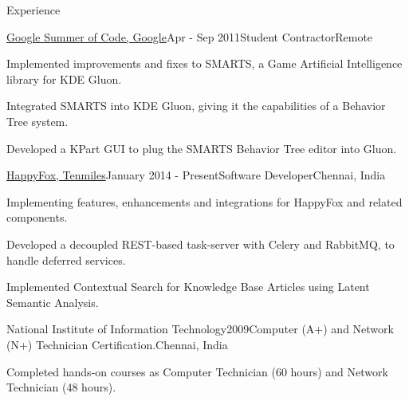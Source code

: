 \documentclass{resume} %
\begin{document}
\begin{rSection}{Experience}

    \begin{rSubsection}{\href{https://www.google-melange.com/gsoc/project/details/google/gsoc2011/pranavrc/5757334940811264}{Google Summer of Code, Google}}{Apr - Sep 2011}{Student Contractor}{Remote}
\item Implemented improvements and fixes to SMARTS, a Game Artificial Intelligence library for KDE Gluon.
\item Integrated SMARTS into KDE Gluon, giving it the capabilities of a Behavior Tree system.
\item Developed a KPart GUI to plug the SMARTS Behavior Tree editor into Gluon.
\end{rSubsection}


\begin{rSubsection}{\href{https://happyfox.com/}{HappyFox, Tenmiles}}{January 2014 - Present}{Software Developer}{Chennai, India}
\item Implementing features, enhancements and integrations for HappyFox and related components.
\item Developed a decoupled REST-based task-server with Celery and RabbitMQ, to handle deferred services.
\item Implemented Contextual Search for Knowledge Base Articles using Latent Semantic Analysis.
\end{rSubsection}


\begin{rSubsection}{National Institute of Information Technology}{2009}{Computer (A+) and Network (N+) Technician Certification.}{Chennai, India}
\item Completed hands-on courses as Computer Technician (60 hours) and Network Technician (48 hours).
\end{rSubsection}

\end{rSection}

\end{document}
